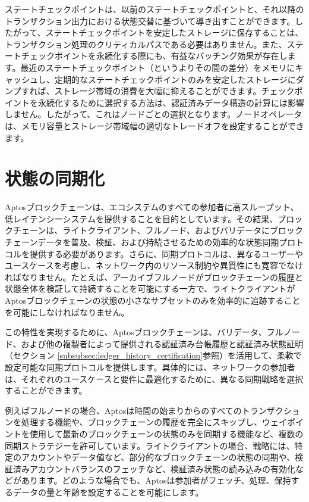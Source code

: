 \documentclass{article}
\begin{document}
ステートチェックポイントは、以前のステートチェックポイントと、それ以降のトランザクション出力における状態交替に基づいて導き出すことができます。したがって、ステートチェックポイントを安定したストレージに保存することは、トランザクション処理のクリティカルパスである必要はありません。また、ステートチェックポイントを永続化する際にも、有益なバッチング効果が存在します。最近のステートチェックポイント（というよりその間の差分）をメモリにキャッシュし、定期的なステートチェックポイントのみを安定したストレージにダンプすれば、ストレージ帯域の消費を大幅に抑えることができます。チェックポイントを永続化するために選択する方法は、認証済みデータ構造の計算には影響しません。したがって、これはノードごとの選択となります。ノードオペレータは、メモリ容量とストレージ帯域幅の適切なトレードオフを設定することができます。

\section{状態の同期化}
\label{sub:state_sync}

Aptosブロックチェーンは、エコシステムのすべての参加者に高スループット、低レイテンシーシステムを提供することを目的としています。その結果、ブロックチェーンは、ライトクライアント、フルノード、およびバリデータにブロックチェーンデータを普及、検証、および持続させるための効率的な状態同期プロトコルを提供する必要があります\cite{evolution_state_sync}。さらに、同期プロトコルは、異なるユーザーやユースケースを考慮し、ネットワーク内のリソース制約や異質性にも寛容でなければなりません。たとえば、アーカイブフルノードがブロックチェーンの履歴と状態全体を検証して持続することを可能にする一方で、ライトクライアントがAptosブロックチェーンの状態の小さなサブセットのみを効率的に追跡することを可能にしなければなりません。

この特性を実現するために、Aptosブロックチェーンは、バリデータ、フルノード、および他の複製者によって提供される認証済み台帳履歴と認証済み状態証明（セクション \ref{subsubsec:ledger_history_certification}参照）を活用して、柔軟で設定可能な同期プロトコルを提供します。具体的には、ネットワークの参加者は、それぞれのユースケースと要件に最適化するために、異なる同期戦略を選択することができます。

例えばフルノードの場合、Aptosは時間の始まりからのすべてのトランザクションを処理する機能や、ブロックチェーンの履歴を完全にスキップし、ウェイポイントを使用して最新のブロックチェーンの状態のみを同期する機能など、複数の同期ストラテジーを許可しています。ライトクライアントの場合、戦略には、特定のアカウントやデータ値など、部分的なブロックチェーンの状態の同期や、検証済みアカウントバランスのフェッチなど、検証済み状態の読み込みの有効化などがあります。どのような場合でも、Aptosは参加者がフェッチ、処理、保持するデータの量と年齢を設定することを可能にします。
\end{document}
